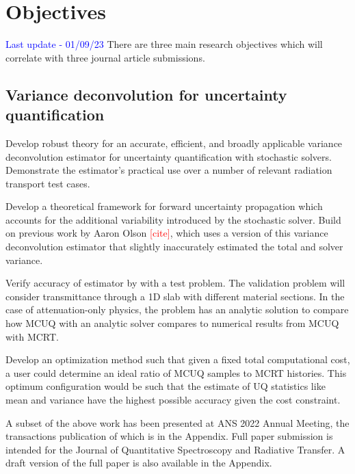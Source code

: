 \chapter{Objectives} \label{ch-objectives}
\textcolor{blue}{Last update - 01/09/23}
There are three main research objectives which will correlate with three journal article submissions. 

\section{Variance deconvolution for uncertainty quantification}
Develop robust theory for an accurate, efficient, and broadly applicable variance deconvolution estimator for uncertainty quantification with stochastic solvers. Demonstrate the estimator's practical use over a number of relevant radiation transport test cases.
\begin{todolist}
    \item[\done] Develop a theoretical framework for forward uncertainty propagation which accounts for the additional variability introduced by the stochastic solver. Build on previous work by Aaron Olson \textcolor{red}{[cite]}, which uses a version of this variance deconvolution estimator that slightly inaccurately estimated the total and solver variance. 
    \item[\done] Verify accuracy of estimator by with a test problem. The validation problem will consider transmittance through a 1D slab with different material sections. In the case of attenuation-only physics, the problem has an analytic solution to compare how MCUQ with an analytic solver compares to numerical results from MCUQ with MCRT. 
    \item[\done] Develop an optimization method such that given a fixed total computational cost, a user could determine an ideal ratio of MCUQ samples to MCRT histories. This optimum configuration would be such that the estimate of UQ statistics like mean and variance have the highest possible accuracy given the cost constraint.
    \item A subset of the above work has been presented at ANS 2022 Annual Meeting, the transactions publication of which is in the Appendix. Full paper submission is intended for the Journal of Quantitative Spectroscopy and Radiative Transfer. A draft version of the full paper is also available in the Appendix.
\end{todolist}



